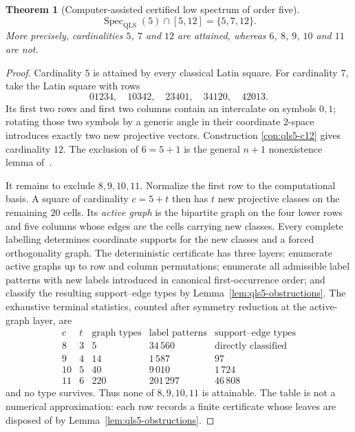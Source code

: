 \documentclass[11pt]{amsart}
\newtheorem{theorem}{Theorem}[section]
\theoremstyle{definition}
\newcommand{\QLS}{\mathrm{QLS}}
\begin{document}
\begin{theorem}[Computer-assisted certified low spectrum of order five]
\label{thm:qls5-low}
\[
\operatorname{Spec}_{\QLS}(5)\cap[5,12]=\{5,7,12\}.
\]
More precisely, cardinalities $5$, $7$ and $12$ are attained, whereas
$6$, $8$, $9$, $10$ and $11$ are not.
\end{theorem}

\begin{proof}
Cardinality $5$ is attained by every classical Latin square.  For
cardinality $7$, take the Latin square with rows
\[
01234,\quad 10342,\quad 23401,\quad 34120,\quad 42013.
\]
Its first two rows and first two columns contain an intercalate on symbols
$0,1$; rotating those two symbols by a generic angle in their coordinate
$2$-space introduces exactly two new projective vectors.  Construction
\ref{con:qls5-c12} gives cardinality $12$.  The exclusion of $6=5+1$ is the
general $n+1$ nonexistence lemma of~\cite[Lem.~3.1]{ZWJ2026}.

It remains to exclude $8,9,10,11$.  Normalize the first row to the
computational basis.  A square of cardinality $c=5+t$ then has $t$ new
projective classes on the remaining $20$ cells.  Its \emph{active graph} is
the bipartite graph on the four lower rows and five columns whose edges are
the cells carrying new classes.  Every complete labelling determines
coordinate supports for the new classes and a forced orthogonality graph.
The deterministic certificate has three layers: enumerate active graphs up
to row and column permutations; enumerate all admissible label patterns
with new labels introduced in canonical first-occurrence order; and
classify the resulting support--edge types by
Lemma~\ref{lem:qls5-obstructions}.  The exhaustive terminal statistics,
counted after symmetry reduction at the active-graph layer, are
\[
\begin{array}{ccrrr}
c & t & \text{graph types} & \text{label patterns} &
\text{support--edge types}\\
\hline
8  & 3 & 5   & 34\,560  & \text{directly classified}\\
9  & 4 & 14  & 1\,587   & 97\\
10 & 5 & 40  & 9\,010   & 1\,724\\
11 & 6 & 220 & 201\,297 & 46\,808
\end{array}
\]
and no type survives.  Thus none of $8,9,10,11$ is attainable.  The table is
not a numerical approximation: each row records a finite certificate whose
leaves are disposed of by Lemma~\ref{lem:qls5-obstructions}.
\end{proof}
\end{document}
